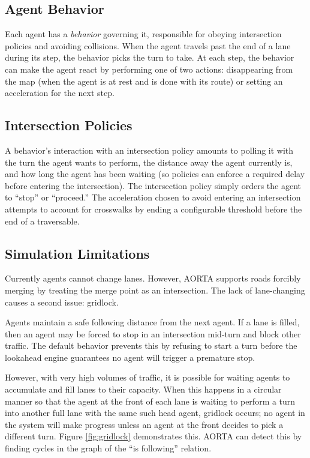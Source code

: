 \documentclass[letterpaper, 10 pt, conference]{ieeeconf}  %
\begin{document}
\subsection{Agent Behavior}

Each agent has a \emph{behavior} governing it, responsible for obeying
intersection policies and avoiding collisions. When the agent travels past the
end of a lane during its step, the behavior picks the turn to take. At each
step, the behavior can make the agent react by performing one of two actions:
disappearing from the map (when the agent is at rest and is done with its route)
or setting an acceleration for the next step.

\subsection{Intersection Policies}

A behavior's interaction with an intersection policy amounts to polling it with
the turn the agent wants to perform, the distance away the agent currently is,
and how long the agent has been waiting (so policies can enforce a required
delay before entering the intersection). The intersection policy simply orders
the agent to ``stop'' or ``proceed.'' The acceleration chosen to avoid entering
an intersection attempts to account for crosswalks by ending a configurable
threshold before the end of a traversable.

\subsection{Simulation Limitations}

Currently agents cannot change lanes. However, AORTA supports roads forcibly
merging by treating the merge point as an intersection. The lack of
lane-changing causes a second issue: gridlock.

Agents maintain a safe following distance from the next agent. If a lane is
filled, then an agent may be forced to stop in an intersection mid-turn and
block other traffic. The default behavior prevents this by refusing to start a
turn before the lookahead engine guarantees no agent will trigger a premature
stop.

However, with very high volumes of traffic, it is possible for waiting agents to
accumulate and fill lanes to their capacity. When this happens in a circular
manner so that the agent at the front of each lane is waiting to perform a turn
into another full lane with the same such head agent, gridlock \cite{gridlock}
occurs; no agent in the system will make progress unless an agent at the front
decides to pick a different turn. Figure \ref{fig:gridlock} demonstrates this.
AORTA can detect this by finding cycles in the graph of the ``is following''
relation.
\end{document}
